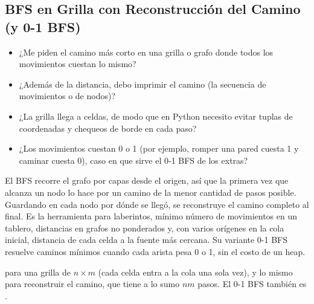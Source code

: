 \subsection{BFS en Grilla con Reconstrucción del Camino (y 0-1 BFS)}
\label{alg:4-11}


\begin{itemize}
\item ¿Me piden el camino más corto en una grilla o grafo donde todos los movimientos cuestan lo mismo?
\item ¿Además de la distancia, debo imprimir el camino (la secuencia de movimientos o de nodos)?
\item ¿La grilla llega a  celdas, de modo que en Python necesito evitar tuplas de coordenadas y chequeos de borde en cada paso?
\item ¿Los movimientos cuestan 0 o 1 (por ejemplo, romper una pared cuesta 1 y caminar cuesta 0), caso en que sirve el 0-1 BFS de los extras?
\end{itemize}

 El BFS recorre el grafo por capas desde el origen, así que la primera vez que alcanza un nodo lo hace por un camino de la menor cantidad de pasos posible. Guardando en cada nodo por dónde se llegó, se reconstruye el camino completo al final. Es la herramienta para laberintos, mínimo número de movimientos en un tablero, distancias en grafos no ponderados y, con varios orígenes en la cola inicial, distancia de cada celda a la fuente más cercana. Su variante 0-1 BFS resuelve caminos mínimos cuando cada arista pesa 0 o 1, sin el costo de un heap.

  para una grilla de $n \times m$ (cada celda entra a la cola una sola vez), y lo mismo para reconstruir el camino, que tiene a lo sumo $nm$ pasos. El 0-1 BFS también es .

